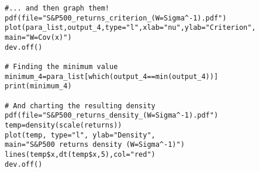 \begin{appendices}
\begin{verbatim}
#... and then graph them!
pdf(file="S&P500_returns_criterion_(W=Sigma^-1).pdf")
plot(para_list,output_4,type="l",xlab="nu",ylab="Criterion",
main="W=Cov(x)")
dev.off()

# Finding the minimum value
minimum_4=para_list[which(output_4==min(output_4))]
print(minimum_4)

# And charting the resulting density
pdf(file="S&P500_returns_density_(W=Sigma^-1).pdf")
temp=density(scale(returns))
plot(temp, type="l", ylab="Density", 
main="S&P500 returns density (W=Sigma^-1)")
lines(temp$x,dt(temp$x,5),col="red")       
dev.off()

\end{verbatim}
\end{appendices}
